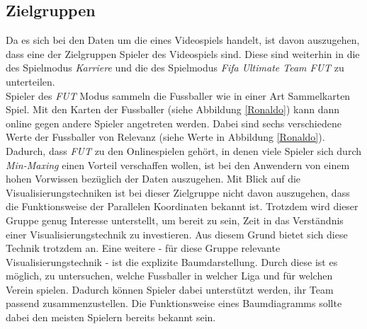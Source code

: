 \documentclass[usegeometry=true]{scrartcl}
\begin{document}
\subsection{Zielgruppen}
Da es sich bei den Daten um die eines Videospiels handelt, ist davon auszugehen, dass eine der Zielgruppen Spieler des Videospiels sind. Diese sind weiterhin in die des Spielmodus \textit{Karriere} und die des Spielmodus \textit{Fifa Ultimate Team  FUT} zu unterteilen.\\
Spieler des \textit{FUT} Modus sammeln die Fussballer wie in einer Art Sammelkarten Spiel. Mit den Karten der Fussballer (siehe Abbildung \ref{Ronaldo}) kann dann online gegen andere Spieler angetreten werden.
Dabei sind sechs verschiedene Werte der Fussballer von Relevanz (siehe Werte in Abbildung \ref{Ronaldo}). %
Dadurch, dass \textit{FUT} zu den Onlinespielen gehört, in denen viele Spieler sich durch \textit{Min-Maxing}\cite{noauthor_min-maxing_2014} einen Vorteil verschaffen wollen, ist bei den Anwendern von einem hohen Vorwissen bezüglich der Daten auszugehen. Mit Blick auf die Visualisierungstechniken ist bei dieser Zielgruppe nicht davon auszugehen, dass die Funktionsweise der Parallelen Koordinaten bekannt ist. Trotzdem wird dieser Gruppe genug Interesse unterstellt, um bereit zu sein, Zeit in das Verständnis einer Visualisierungstechnik zu investieren. Aus diesem Grund bietet sich diese Technik trotzdem an. Eine weitere - für diese Gruppe relevante Visualisierungstechnik - ist die explizite Baumdarstellung. Durch diese ist es möglich, zu untersuchen, welche Fussballer in welcher Liga und für welchen Verein spielen. Dadurch können Spieler dabei unterstützt werden, ihr Team passend zusammenzustellen. Die Funktionsweise eines Baumdiagramms sollte dabei den meisten Spielern bereits bekannt sein.\\
\end{document}
